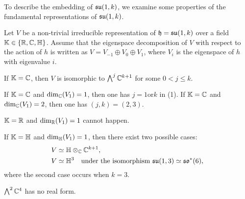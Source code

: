 To describe the embedding of $\mathfrak{su}(1, k)$, we examine some properties of the fundamental representations of $\mathfrak{su}(1, k)$.

\begin{lemma} \label{lem:FundamentalRep}
	Let $V$ be a non-trivial irreducible representation of $\mathfrak{h} = \mathfrak{su}(1, k)$ over a field $\mathbb{K} \in \left\{\mathbb{R}, \mathbb{C}, \mathbb{H} \right\}$.
	Assume that the eigenspace decomposition of $V$ with respect to the action of $h$ is written as $V = V_{-1} \oplus V_0 \oplus V_1$, where $V_i$ is the eigenspace of $h$ with eigenvalue $i$.
	\begin{enumparen}
		\item If $\mathbb{K} = \mathbb{C}$, then $V$ is isomorphic to $\bigwedge\nolimits^j \mathbb{C}^{k+1}$ for some $0 < j \leq k$.
		\item If $\mathbb{K} = \mathbb{C}$ and $\dim_{\mathbb{C}}(V_1) = 1$, then one has $j = 1 \text{or} k$ in (1).
		If $\mathbb{K} = \mathbb{C}$ and $\dim_{\mathbb{C}}(V_1) = 2$, then one has $(j, k) = (2, 3)$.
		\item $\mathbb{K} = \mathbb{R}$ and $\dim_{\mathbb{R}}(V_1) = 1$ cannot happen.
		\item If $\mathbb{K} = \mathbb{H}$ and $\dim_{\mathbb{H}}(V_1) = 1$, then there exist two possible cases:
		\begin{align*}
			V&\simeq \mathbb{H}\otimes_{\mathbb{C}}\mathbb{C}^{k+1}, \\
			V&\simeq \mathbb{H}^3 \quad \text{under the isomorphism $\mathfrak{su}(1, 3) \simeq \mathfrak{so}^*(6)$},
		\end{align*}
		where the second case occurs when $k = 3$.
		\item $\bigwedge\nolimits^2 \mathbb{C}^4$ has no real form.
	\end{enumparen}
\end{lemma}

